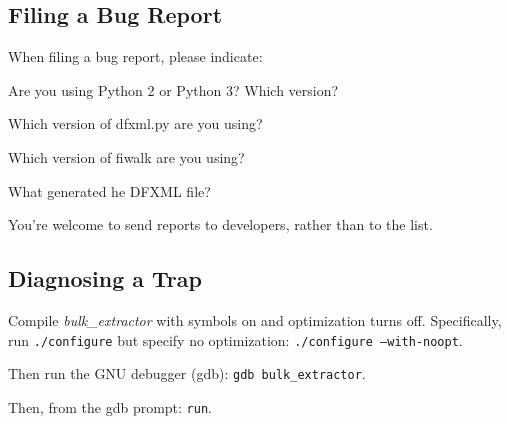 \documentclass[10pt,twoside]{article}
\newcommand{\bulk}{\emph{bulk\_extractor}\xspace}
\newcommand{\bev}{\emph{BEViewer}\xspace}
\begin{document}
\subsection{Filing a Bug Report}
When filing a bug report, please indicate:
\begin{compactenum}
\item Are you using Python 2 or Python 3? Which version?
\item Which version of dfxml.py are you using?
\item Which  version of fiwalk are you using?
\item What generated he DFXML file?
\end{compactenum}
You're welcome to send reports to developers, rather than to the list.

\subsection{Diagnosing a Trap}
\begin{compactenum}
\item Compile \bulk with symbols on and optimization turns off.
Specifically, run \texttt{./configure}
but specify no optimization: \texttt{./configure --with-noopt}.
\item Then run the GNU debugger (gdb): \texttt{gdb bulk\_extractor}.
\item Then, from the gdb prompt: \texttt{run}.
\end{compactenum}


\cleardoublepage



\cleardoublepage
\printglossaries

\end{document}
